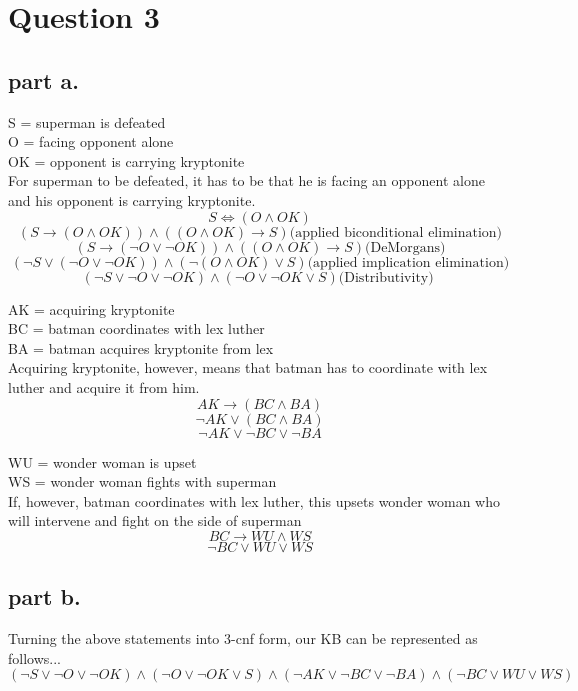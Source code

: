 \section{Question 3}
\subsection{part a.}
S = superman is defeated \\
O = facing opponent alone \\
OK = opponent is carrying kryptonite \\
For superman to be defeated, it has to be that he is facing an opponent alone and his opponent is carrying kryptonite. \\
\[
S \iff (O \land OK)  \]
\[
(S \to (O \land OK)) \land ((O \land OK) \to S)                            \text{(applied biconditional elimination)} \]
\[
(S \to (\neg{O} \lor \neg{OK})) \land ((O \land OK) \to S)                 \text{(DeMorgans)}                         
\]
\[
(\neg{S} \lor (\neg{O} \lor \neg{OK})) \land (\neg{(O \land OK)} \lor S)   \text{(applied implication elimination)}  \] 
\[
(\neg{S} \lor \neg{O} \lor \neg{OK})  \land (\neg{O} \lor \neg{OK} \lor S) \text{(Distributivity)                }    
\] 

AK = acquiring kryptonite \\
BC = batman coordinates with lex luther \\
BA = batman acquires kryptonite from lex \\
\noindent
Acquiring kryptonite, however, means that batman has to coordinate with lex luther and
acquire it from him. \\
\[
AK \to (BC \land BA) \]
\[\neg AK \lor (BC \land BA) \]
\[\neg AK \lor \neg BC \lor \neg BA \]

WU = wonder woman is upset \\
WS = wonder woman fights with superman \\
If, however, batman coordinates with lex luther, this upsets wonder woman who will intervene and fight on the side of superman\\
\[
BC \to WU \land WS \]
\[\neg BC \lor WU \lor WS
\]
\subsection{part b.}
Turning the above statements into 3-cnf form, our KB can be represented as follows...\\
\[
(\neg{S} \lor \neg{O} \lor \neg{OK})  \land (\neg{O} \lor \neg{OK} \lor S)  \land (\neg AK \lor \neg BC \lor \neg BA) \land (\neg BC \lor WU \lor WS)
\]
